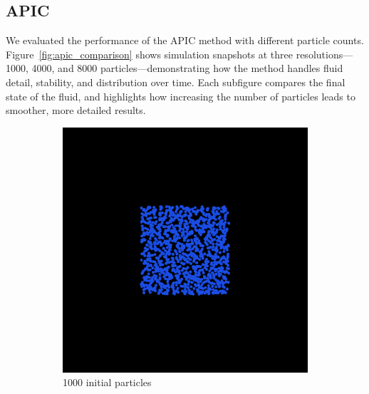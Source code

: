 \subsection{APIC}

We evaluated the performance of the APIC method with different particle counts. Figure~\ref{fig:apic_comparison} shows simulation snapshots at three resolutions—1000, 4000, and 8000 particles—demonstrating how the method handles fluid detail, stability, and distribution over time. Each subfigure compares the final state of the fluid, and highlights how increasing the number of particles leads to smoother, more detailed results.

\begin{figure}[h]
    \centering
    \begin{subfigure}[b]{0.2\textwidth}
        \includegraphics[width=\textwidth]{figures/apic1000_init.png}
        \caption{1000 initial particles}
    \end{subfigure}
    \hspace{1em}
    \begin{subfigure}[b]{0.2\textwidth}

\end{subfigure}
\end{figure}
